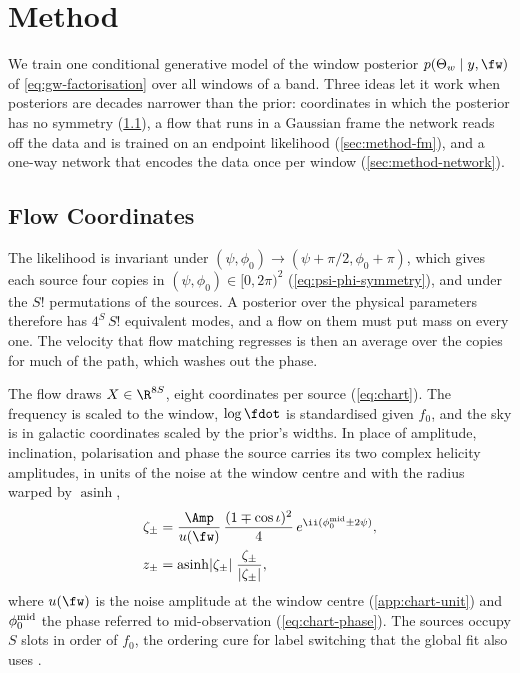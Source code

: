 \section{Method}
\label{sec:method}

We train one conditional generative model of the window posterior $p(\Theta_w\mid y,\fw)$ of
\cref{eq:gw-factorisation} over all windows of a band. Three ideas let it work when posteriors are
decades narrower than the prior: coordinates in which the posterior has no symmetry
(\cref{sec:method-chart}), a flow that runs in a Gaussian frame the network reads off the data and
is trained on an endpoint likelihood (\cref{sec:method-fm}), and a one-way network that encodes the
data once per window (\cref{sec:method-network}).

\subsection{Flow Coordinates}
\label{sec:method-chart}\label{sec:gw-chart}

The likelihood is invariant under $(\psi,\phi_0)\to(\psi+\pi/2,\phi_0+\pi)$, which gives each source
four copies in $(\psi,\phi_0)\in[0,2\pi)^2$ (\cref{eq:psi-phi-symmetry}), and under the $S!$
permutations of the sources. A posterior over the physical parameters therefore has $4^S\,S!$
equivalent modes, and a flow on them must put mass on every one. The velocity that flow matching
regresses is then an average over the copies for much of the path, which washes out the phase.

The flow draws $X\in\R^{8S}$, eight coordinates per source (\cref{eq:chart}). The frequency is
scaled to the window, $\log\fdot$ is standardised given $f_0$, and the sky is in galactic
coordinates scaled by the prior's widths. In place of amplitude, inclination, polarisation and
phase the source carries its two complex helicity amplitudes, in units of the noise at the window
centre and with the radius warped by $\operatorname{asinh}$,
\begin{equation}
\begin{aligned}
  \zeta_\pm &= \frac{\Amp}{u(\fw)}\,\frac{(1\mp\cos\iota)^2}{4}\,e^{\ii(\phi_0^{\rm mid}\pm2\psi)},\\
  z_\pm &= \operatorname{asinh}\lvert\zeta_\pm\rvert\;\frac{\zeta_\pm}{\lvert\zeta_\pm\rvert},
\end{aligned}
  \label{eq:chart-helicity}
\end{equation}
where $u(\fw)$ is the noise amplitude at the window centre (\cref{app:chart-unit}) and
$\phi_0^{\rm mid}$ the phase referred to mid-observation (\cref{eq:chart-phase}). The sources occupy
$S$ slots in order of $f_0$, the ordering cure for label switching
\citep{stephens2000dealing,jasra2005markov,buscicchio2019label} that the global fit also uses
\citep{littenberg2020global}.

